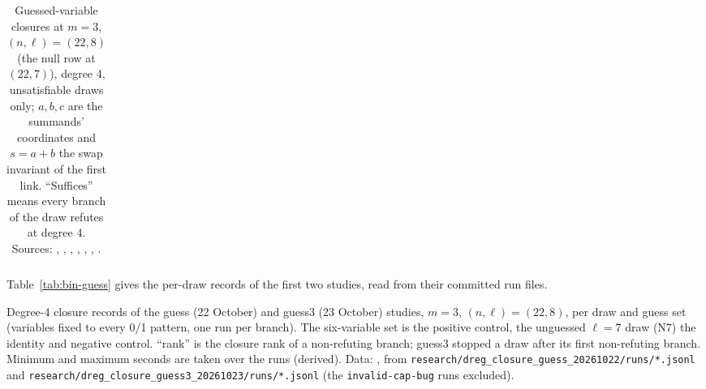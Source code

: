 \begin{table}[t]
\begin{tabularx}{\linewidth}{@{}l>{\raggedright}X>{\raggedright}X>{\raggedright\arraybackslash}p{0.2\linewidth}@{}}
\bottomrule
\end{tabularx}
\caption[]{Guessed-variable closures at $m=3$, $(n,\ell)=(22,8)$ (the null
row at $(22,7)$), degree 4, unsatisfiable draws only; $a,b,c$ are the
summands' coordinates and $s=a+b$ the swap invariant of the first link.
``Suffices'' means every branch of the draw refutes at degree 4. Sources:
,
,
,
,
,
,
.}
\label{tab:bd-guess}
\end{table}

Table~\ref{tab:bin-guess} gives the per-draw records of the first two
studies, read from their committed run files.

\begin{table}[t]
\centering\small\setlength{\tabcolsep}{4pt}

\caption[]{Degree-4 closure records of the guess (22 October) and guess3
(23 October) studies, $m=3$, $(n,\ell)=(22,8)$, per draw and guess set
(variables fixed to every 0/1 pattern, one run per branch). The six-variable
set is the positive control, the unguessed $\ell=7$ draw (N7) the identity
and negative control. ``rank'' is the closure rank of a non-refuting branch;
guess3 stopped a draw after its first non-refuting branch. Minimum and
maximum seconds are taken over the runs (derived). Data:
, from
\texttt{research/dreg\_closure\_guess\_20261022/runs/*.jsonl} and
\texttt{research/dreg\_closure\_guess3\_20261023/runs/*.jsonl} (the
\texttt{invalid-cap-bug} runs excluded).}
\label{tab:bin-guess}
\end{table}

